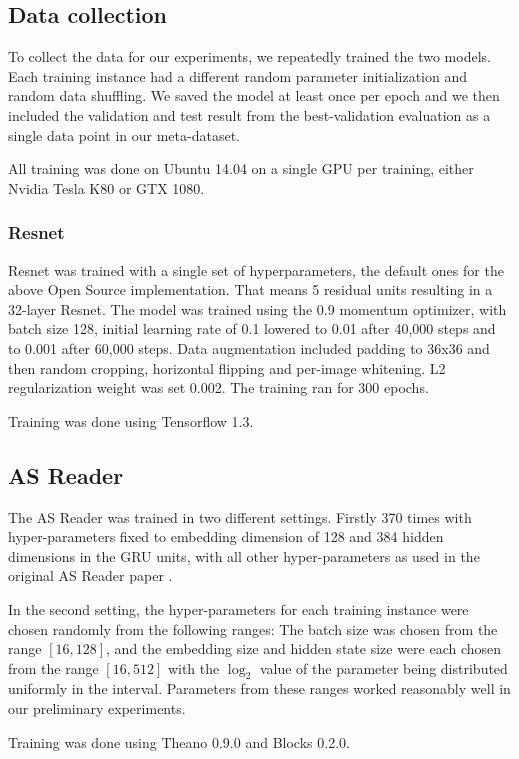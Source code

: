 \documentclass{article}
\begin{document}
\begin{appendices}
\subsection{Data collection}
To collect the data for our experiments, we repeatedly trained the two models. Each training instance had a different random parameter initialization and random data shuffling. We saved the model at least once per epoch and we then included the validation and test result from the best-validation evaluation as a single data point in our meta-dataset. 

All training was done on Ubuntu 14.04 on a single GPU per training, either Nvidia Tesla K80 or GTX 1080.

\subsubsection{Resnet}
Resnet was trained with a single set of hyperparameters, the default ones for the above Open Source implementation. That means 5 residual units resulting in a 32-layer Resnet. The model was trained using the 0.9 momentum optimizer, with batch size 128, initial learning rate of 0.1 lowered to 0.01 after 40,000 steps and to 0.001 after 60,000 steps. Data augmentation included padding to 36x36 and then random cropping, horizontal flipping and per-image whitening. L2 regularization weight was set 0.002. The training ran for 300 epochs.

Training was done using Tensorflow 1.3.

\subsection{AS Reader}
The AS Reader was trained in two different settings. Firstly 370 times with hyper-parameters fixed to embedding dimension of 128 and 384 hidden dimensions in the GRU units, with all other hyper-parameters as used in the original AS Reader paper \citep{Kadlec2016}.

In the second setting, the hyper-parameters for each training instance were chosen randomly from the following ranges: The batch size was chosen from the range $[16,128]$, and the embedding size and hidden state size were each chosen from the range $[16,512]$ with the $\log_2$ value of the parameter being distributed uniformly in the interval. Parameters from these ranges worked reasonably well in our preliminary experiments. 

Training was done using Theano 0.9.0 and Blocks 0.2.0.


\end{appendices}
\end{document}
